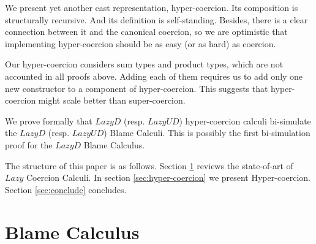 \documentclass[acmsmall,review,anonymous]{acmart}\settopmatter{printfolios=true,printccs=false,printacmref=false}
\begin{document}
We present yet another cast representation, hyper-coercion. Its 
composition is structurally recursive. And its definition is self-standing. 
Besides, there is a clear connection between it and the canonical coercion, 
so we are optimistic that implementing hyper-coercion should be as easy (or 
as hard) as coercion.

Our hyper-coercion considers sum types and product types, which are not 
accounted in all proofs above. Adding each of them requires us to add only one 
new constructor to a component of hyper-coercion. This suggests that 
hyper-coercion might scale better than super-coercion.

We prove formally that $ Lazy D $ (resp. $ Lazy UD $) hyper-coercion calculi 
bi-simulate the $ Lazy D $ (resp. $ Lazy UD $) Blame Calculi. This is possibly 
the first bi-simulation proof for the $ Lazy D $ Blame Calculus.

The structure of this paper is as follows. Section \ref{sec:blame-calculus} 
reviews the state-of-art of $Lazy$ Coercion Calculi. In section 
\ref{sec:hyper-coercion} we present Hyper-coercion. Section \ref{sec:conclude} 
concludes.

\section{Blame Calculus} \label{sec:blame-calculus}
\end{document}
